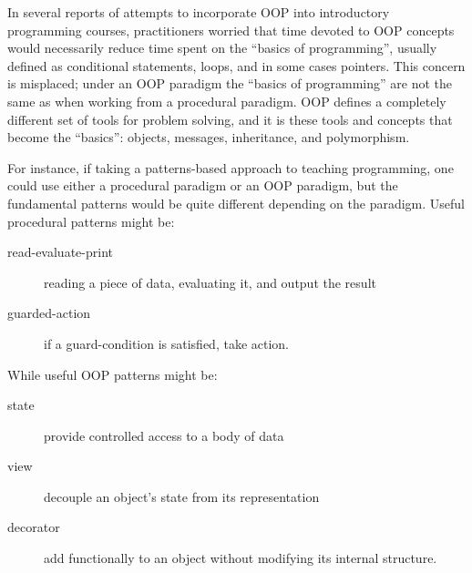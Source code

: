 \documentclass[12pt]{article}
\begin{document}

In several reports of attempts to incorporate OOP into introductory
programming courses, practitioners worried that time devoted to OOP
concepts would necessarily reduce time spent on the ``basics of
programming'', usually defined as conditional statements, loops, and
in some cases pointers. This concern is misplaced; under an OOP
paradigm the ``basics of programming'' are not the same as when
working from a procedural paradigm. OOP defines a completely different
set of tools for problem solving, and it is these tools and concepts
that become the ``basics'': objects, messages, inheritance, and
polymorphism\autocite{kolling_problem_1999,kay_history_1996}.

For instance, if taking a patterns-based approach to teaching
programming, one could use either a procedural paradigm or an OOP
paradigm, but the fundamental patterns would be quite different
depending on the paradigm\autocite{wallingford_first_1996}. Useful
procedural patterns might be:

\begin{description}
\item[read-evaluate-print] reading a piece of data, evaluating it, and output the result
\item[guarded-action] if a guard-condition is satisfied, take action.
\end{description}

While useful OOP patterns might be:

\begin{description}
\item[state]  provide controlled access to a body of data
\item[view] decouple an object's state from its representation
\item[decorator] add functionally to an object without modifying its internal structure.
\end{description}
\end{document}
